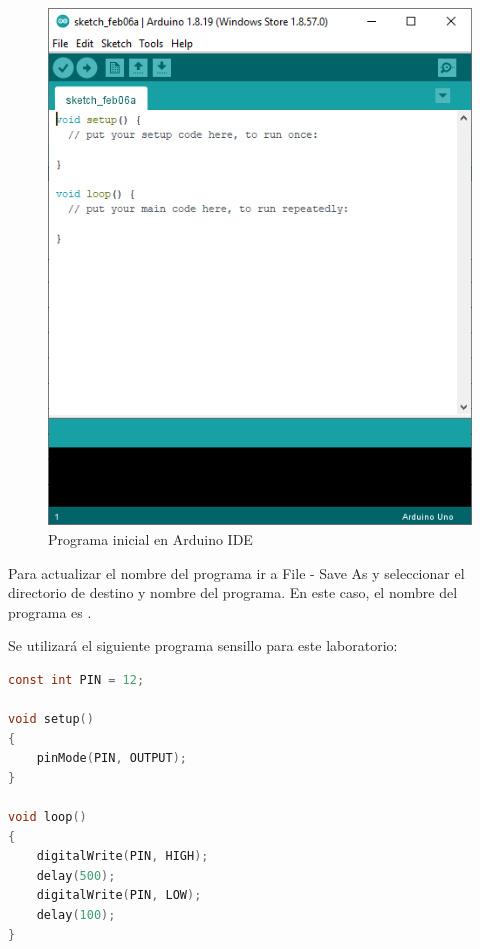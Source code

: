 \documentclass{article}
\begin{document}
    \begin{figure}[H]
        \centering
        \includegraphics[width=0.3\paperwidth]{images/arduino-1}
        \caption{Programa inicial en Arduino IDE}\label{fig:figure2}
    \end{figure}

    Para actualizar el nombre del programa ir a File - Save As y seleccionar
    el directorio de destino y nombre del programa. En este caso, el nombre
    del programa es .

    \bigbreak

    Se utilizará el siguiente programa sensillo para este laboratorio:

    \begin{lstlisting}[language=C, caption=Programa para activar una salida
    digital, label={lst:lstlisting}]
const int PIN = 12;

void setup()
{
    pinMode(PIN, OUTPUT);
}

void loop()
{
    digitalWrite(PIN, HIGH);
    delay(500);
    digitalWrite(PIN, LOW);
    delay(100);
}
    \end{lstlisting}
\end{document}
